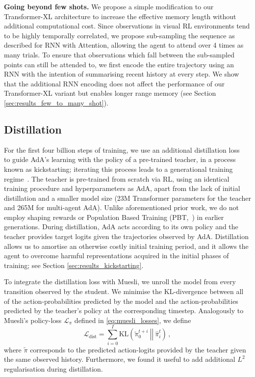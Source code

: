 \textbf{Going beyond few shots.} We propose a simple modification to our Transformer-XL architecture to increase the effective memory length without additional computational cost. Since observations in visual RL environments tend to be highly temporally correlated, we propose sub-sampling the sequence as described for RNN with Attention, allowing the agent to attend over 4 times as many trials. To ensure that observations which fall between the sub-sampled points can still be attended to, we first encode the entire trajectory using an RNN with the intention of summarising recent history at every step. We show that the additional RNN encoding does not affect the performance of our Transformer-XL variant but enables longer range memory (see Section \ref{sec:results_few_to_many_shot}). 

\subsection{Distillation} \label{sec:methods_distillation}

For the first four billion steps of training, we use an additional distillation loss~\citep{Schmidhuber1992distillation, schmitt2018kickstarting, czarnecki2019distilling} to guide AdA's learning with the policy of a pre-trained teacher, in a process known as kickstarting; iterating this process leads to a generational training regime~\citep{xland,wang2102alchemy}. The teacher is pre-trained from scratch via RL, using an identical training procedure and hyperparameters as AdA, apart from the lack of initial distillation and a smaller model size (23M Transformer parameters for the teacher and 265M for multi-agent AdA). Unlike aforementioned prior work, we do not employ shaping rewards or Population Based Training (PBT,~\citet{jaderberg2017population}) in earlier generations. During distillation, AdA acts according to its own policy and the teacher provides target logits given the trajectories observed by AdA. Distillation allows us to amortise an otherwise costly initial training period, and it allows the agent to overcome harmful representations acquired in the initial phases of training; see Section \ref{sec:results_kickstarting}. 

To integrate the distillation loss with Muesli, we unroll the model from every transition observed by the student. We minimise the KL-divergence between all of the action-probabilities predicted by the model and the action-probabilities predicted by the teacher's policy at the corresponding timestep. Analogously to Muesli's policy-loss $\mathcal{L}_\pi$ defined in \eqref{eq:muesli_losses}, we define
\begin{equation}
\mathcal{L}_{\textrm{dist}}=\sum_{i=0}^I \textrm{KL}\left(\left. \left.\tilde{\pi}^{t+i}_0 \ \right|\right|\ \hat{\pi}^t_i \right)\, ,
\end{equation}
where $\tilde{\pi}$ corresponds to the predicted action-logits provided by the teacher given the same observed history. Furthermore, we found it useful to add additional $L^2$ regularisation during distillation.

